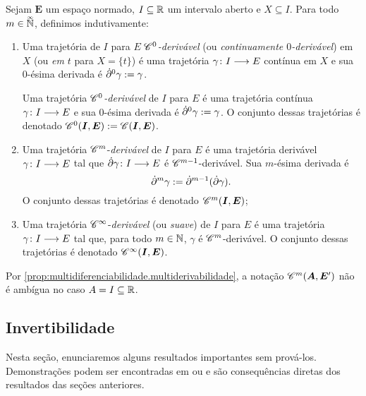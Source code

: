 \begin{definition}
Sejam $\bm E$ um espaço normado, $I \subseteq \mathbb{R}$ um intervalo aberto e $X \subseteq I$. Para todo $m \in \accentset{\infty}{\mathbb{N}}$, definimos indutivamente:
	\begin{enumerate}
	\item Uma trajetória de $I$ para $E$ \emph{$\mathscr{C}^0$-derivável} (ou \emph{continuamente $0$-derivável}) em $X$ (ou \emph{em $t$} para $X=\{t\}$) é uma trajetória ${\gamma}\colon {I} \longrightarrow {E}$ contínua em $X$ e sua $0$-ésima derivada é $\dot{\partial}^0 \gamma := \gamma$.

	Uma trajetória \emph{$\mathscr{C}^0$-derivável} de $I$ para $E$ é uma trajetória contínua ${\gamma}\colon {I} \longrightarrow {E}$ e sua $0$-ésima derivada é $\dot{\partial}^0 \gamma := \gamma$. O conjunto dessas trajetórias é denotado $\mathscr{C}^0(\bm I,\bm E) := \mathscr{C}(\bm I,\bm E)$.

	\item

	Uma trajetória $\mathscr{C}^m$-\emph{derivável} de $I$ para $E$ é uma trajetória derivável ${\gamma}\colon {I} \longrightarrow {E}$ tal que ${\dot{\partial} \gamma}\colon {I} \longrightarrow {E}$ é $\mathscr{C}^{m-1}$-derivável. Sua $m$-ésima derivada é
		\begin{equation*}
		\dot{\partial}^m \gamma := \dot{\partial}^{m-1} (\dot{\partial} \gamma).
		\end{equation*}
	O conjunto dessas trajetórias é denotado $\mathscr{C}^m(\bm I,\bm E)$;

	\item

	Uma trajetória $\mathscr{C}^\infty$-\emph{derivável} (ou \emph{suave}) de $I$ para $E$ é uma trajetória ${\gamma}\colon {I} \longrightarrow {E}$ tal que, para todo $m \in \mathbb{N}$, $\gamma$ é $\mathscr{C}^{m}$-derivável. O conjunto dessas trajetórias é denotado $\mathscr{C}^\infty(\bm I,\bm E)$.
	\end{enumerate}
\end{definition}

Por \ref{prop:multidiferenciabilidade.multiderivabilidade}, a notação $\mathscr{C}^m(\bm A,\bm E')$ não é ambígua no caso $A = I \subseteq \mathbb{R}$.












\subsection{Invertibilidade}

Nesta seção, enunciaremos alguns resultados importantes sem prová-los. Demonstrações podem ser encontradas em \cite{liv:Cartan-DifferentialCalculus} ou \cite{liv:Coleman-CalculusNormedVectorSpaces} e são consequências diretas dos resultados das seções anteriores.

